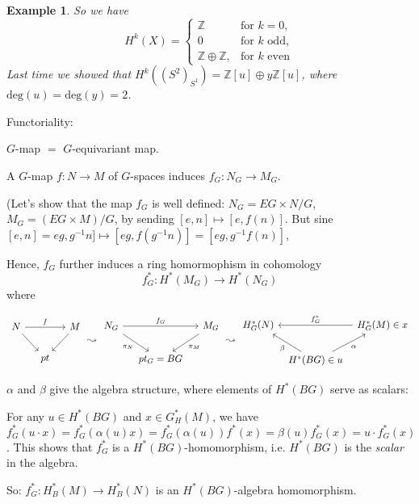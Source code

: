 \documentclass{article}
\theoremstyle{mystyle}
\newtheorem*{example}{Example}
\theoremstyle{remark}
\numberwithin{equation}{section}
\begin{document}
\begin{example}
So we have
$$H^k(X) = \left\{\begin{array}{ll} \mathbb{Z}& \text{for }k=0,\\
0 & \text{for }k\text{ odd},\\
\mathbb{Z}\oplus \mathbb{Z}, & \text{for }k\text{ even}\end{array}\right.$$
Last time we showed that $H^k((S^2)_{S^1})
 = \mathbb{Z}[u]\oplus y \mathbb{Z}[u]$, where $\text{deg}(u) = \text{deg}(y) = 2$. 
\end{example}

Functoriality:

$G$-map $=$ $G$-equivariant map.

A $G$-map $f\colon N\rightarrow M$ of $G$-spaces induces $f_G\colon N_G\rightarrow M_G$.

(Let's show that the map $f_G$ is well defined: $N_G = EG\times N/G$, $M_G = (EG\times M)/G$, by sending $[e,n]\mapsto [e,f(n)]$.
But sine $[e,n] = eg,g^{-1}n]\mapsto [eg,f(g^{-1}n)] = [eg,g^{-1}f(n)]$,

Hence, $f_G$ further induces a ring homormophism in cohomology
$$f^*_G\colon H^*(M_G)\rightarrow H^*(N_G)$$
where

\begin{equation}\label{induce3}
\begin{tikzcd}[column sep = small]
N\ar{rr}{f}\ar[dr] && M \ar[dl]\\
&pt &
\end{tikzcd}
\leadsto
\begin{tikzcd}[column sep = small]
N_G\ar{rr}{f_G}\ar[dr,"\pi_N"'] && M_G \ar{dl}{\pi_M}\\
&pt_G=BG &
\end{tikzcd}
\leadsto
\begin{tikzcd}[column sep = tiny]
H_G^*(N)&& H_G^*(M)\in x \ar[ll,"f^*_G"']\\
&H^*(BG)\in u \ar[ul,"\beta"] \ar[ur,"\alpha"'] & 
\end{tikzcd}
\end{equation}

$\alpha$ and $\beta$ give the algebra structure, where elements of $H^*(BG)$ serve as scalars:

For any $u\in H^*(BG)$ and $x \in G_H^*(M)$, we have
$f^*_G(u\cdot x) = f^*_G(\alpha(u)x) = f^*_G(\alpha(u))f^*(x) = \beta(u)f^*_G(x) = u\cdot f^*_G(x)$. This shows that $f_G^*$ is a $H^*(BG)$-homomorphism, i.e. $H^*(BG)$ is the \emph{scalar} in the algebra.

So: $f^*_G\colon H^*_B(M)\rightarrow H^*_B(N)$ is an $H^*(BG)$-algebra homomorphism.
\end{document}
